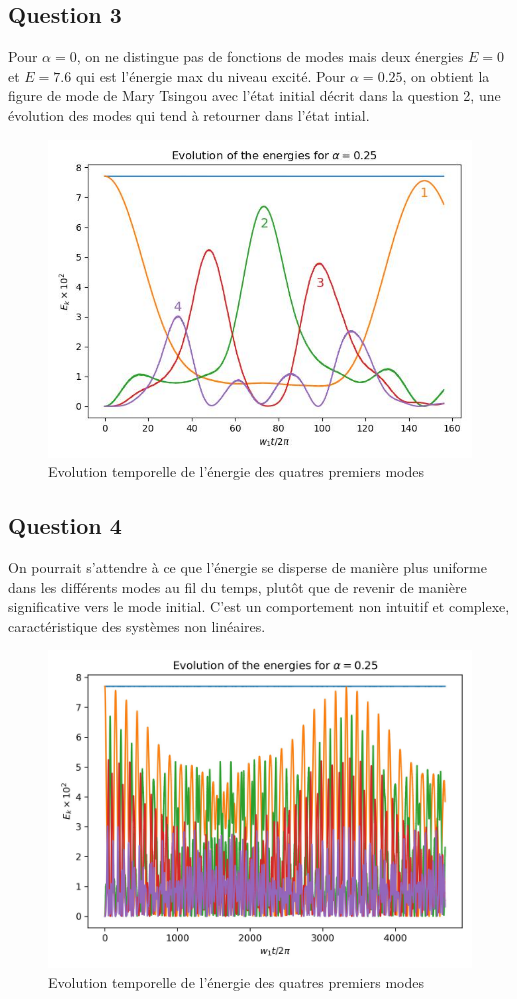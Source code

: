 \documentclass[a4paper, 11pt]{article}
\begin{document}
\subsection*{Question 3}
Pour $\alpha=0$, on ne distingue pas de fonctions de modes mais deux énergies $E=0$ et $E=7.6$ qui est l'énergie max du niveau excité. 
Pour $\alpha=0.25$, on obtient la figure de mode de Mary Tsingou avec l'état initial décrit dans la question 2, une évolution des modes qui tend à retourner dans l'état intial.
\begin{figure}[H]
    \centering
    \includegraphics[width=0.75\linewidth]{pics/fput_0.25.jpg}
    \caption{Evolution temporelle de l'énergie des quatres premiers modes}
    \label{fig:Q3}
\end{figure}

\subsection*{Question 4}
On pourrait s'attendre à ce que l'énergie se disperse de manière plus uniforme dans les différents modes au fil du temps, plutôt que de revenir de manière significative vers le mode initial. C'est un comportement non intuitif et complexe, caractéristique des systèmes non linéaires.
\begin{figure}[H]
    \centering
    \includegraphics[width=0.75\linewidth]{pics/fput_long.jpg}
    \caption{Evolution temporelle de l'énergie des quatres premiers modes}
    \label{fig:Q4}
\end{figure}
\end{document}
